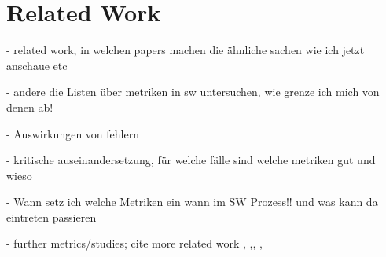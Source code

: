 \section{Related Work}

- related work, in welchen papers machen die ähnliche sachen wie ich jetzt anschaue etc

- andere die Listen über metriken in sw untersuchen, wie grenze ich mich von denen ab!

- Auswirkungen von fehlern

- kritische auseinandersetzung, für welche fälle sind welche metriken gut und wieso

- Wann setz ich welche Metriken ein wann im SW Prozess!! und was kann da eintreten passieren

- further metrics/studies; cite more related work \cite{b10el2001prediction}, \cite{b11basili1996validation},\cite{b12riand2002assessing}, \cite{b14chidamber1994metrics}, \cite{b15chidamber1991towards}